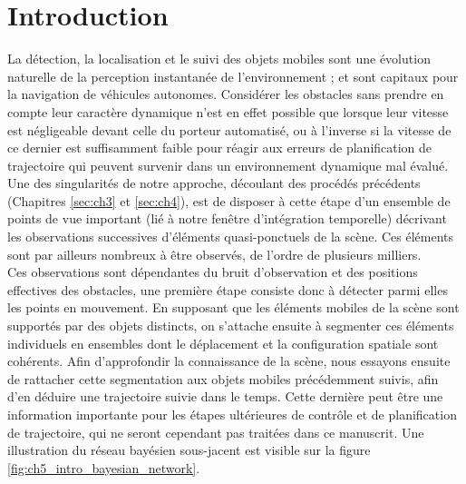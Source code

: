 \vspace{10pt}

\minitoc
\clearpage


\section{Introduction}
La détection, la localisation et le suivi des objets mobiles sont une évolution naturelle de la perception \og instantanée\fg{} de l'environnement ; et sont capitaux pour la navigation de véhicules autonomes. Considérer les obstacles sans prendre en compte leur caractère dynamique n'est en effet possible que lorsque leur vitesse est négligeable devant celle du porteur automatisé, ou à l'inverse si la vitesse de ce dernier est suffisamment faible pour réagir aux erreurs de planification de trajectoire qui peuvent survenir dans un environnement dynamique mal évalué.\\

Une des singularités de notre approche, découlant des procédés précédents (Chapitres \ref{sec:ch3} et \ref{sec:ch4}), est de disposer à cette étape d'un ensemble de points de vue important (lié à notre fenêtre d'intégration temporelle) décrivant les observations successives d'éléments quasi-ponctuels de la scène. Ces éléments sont par ailleurs nombreux à être observés, de l'ordre de plusieurs milliers.\\
Ces observations sont dépendantes du bruit d'observation et des positions effectives des obstacles, une première étape consiste donc à détecter parmi elles les points en mouvement. En supposant que les éléments mobiles de la scène sont supportés par des objets distincts, on s'attache ensuite à segmenter ces éléments individuels en ensembles dont le déplacement et la configuration spatiale sont cohérents. Afin d'approfondir la connaissance de la scène, nous essayons ensuite de rattacher cette segmentation aux objets mobiles précédemment suivis, afin d'en déduire une trajectoire suivie dans le temps. Cette dernière peut être une information importante pour les étapes ultérieures de contrôle et de planification de trajectoire, qui ne seront cependant pas traitées dans ce manuscrit. Une illustration du réseau bayésien sous-jacent est visible sur la figure \ref{fig:ch5_intro_bayesian_network}.

